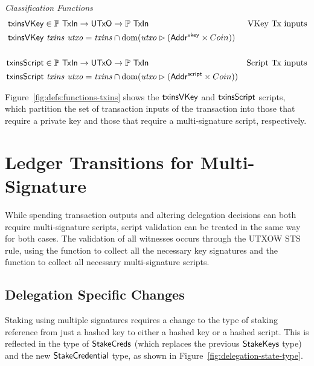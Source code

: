 \documentclass[11pt,a4paper,dvipsnames,twosided]{article}
\newcommand{\AddrVKey}{\type{Addr^{vkey}}}
\newcommand{\UTxO}{\type{UTxO}}
\newcommand{\StakeCreds}{\type{StakeCreds}}
\newcommand{\StakeObject}{\type{StakeCredential}}
\newcommand{\AddrScr}{\type{Addr^{script}}}
\newcommand{\TxIn}{\type{TxIn}}
\theoremstyle{definition}
\begin{document}
\begin{figure*}[htb]
  \emph{Classification Functions}
  \begin{align*}
    \fun{txinsVKey} & \in \powerset \TxIn \to \UTxO \to \powerset\TxIn & \text{VKey Tx inputs}\\
    \fun{txinsVKey} & ~\var{txins}~\var{utxo} =
    \var{txins} \cap \dom (\var{utxo} \restrictrange (\AddrVKey \times Coin))
    \\
    \\
    \fun{txinsScript} & \in \powerset \TxIn \to \UTxO \to \powerset\TxIn & \text{Script Tx inputs}\\
    \fun{txinsScript} & ~\var{txins}~\var{utxo} =
                        \var{txins} \cap \dom (\var{utxo} \restrictrange (\AddrScr \times Coin))
  \end{align*}
  \caption{Key/Script Classification Functions}
  \label{fig:defs:functions-txins}
\end{figure*}

Figure~\ref{fig:defs:functions-txins} shows the $\mathsf{txinsVKey}$ and
$\mathsf{txinsScript}$ scripts, which partition the set of transaction inputs of
the transaction into those that require a private key and those that require a
multi-signature script, respectively.

\section{Ledger Transitions for Multi-Signature}
\label{sec:ledg-trans-multi}

While spending transaction outputs and altering delegation decisions can both
require multi-signature scripts, script validation can be treated in the same
way for both cases. The validation of all witnesses occurs through the UTXOW STS
rule, using the  function to collect all the necessary key
signatures and the  function to collect all necessary
multi-signature scripts.

\subsection{Delegation Specific Changes}
\label{sec:deleg-trans-rules}

Staking using multiple signatures requires a change to the type of staking reference from
just a hashed key to either a hashed key or a hashed script. This is
reflected in the type of $\StakeCreds$ (which replaces the previous
$\mathsf{StakeKeys}$ type) and the new $\StakeObject$ type, %
as shown in
Figure~\ref{fig:delegation-state-type}.
\end{document}
